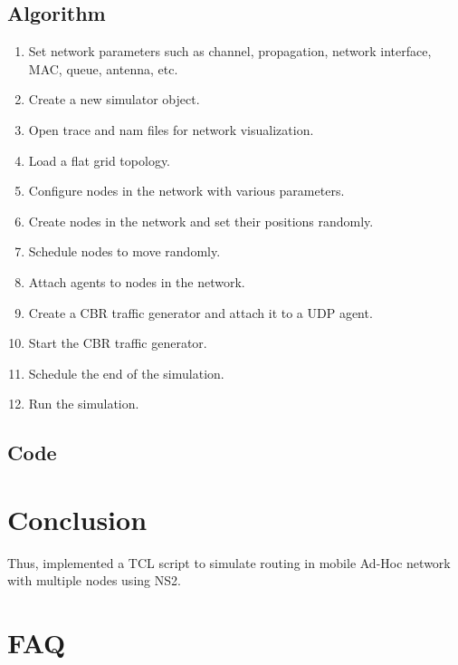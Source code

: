 \documentclass[11pt]{article}
\begin{document}
\subsection{Algorithm}
\begin{enumerate}
    \item Set network parameters such as channel, propagation, network interface, MAC, queue, antenna, etc.
    \item Create a new simulator object.
    \item Open trace and nam files for network visualization.
    \item Load a flat grid topology.
    \item Configure nodes in the network with various parameters.
    \item Create nodes in the network and set their positions randomly.
    \item Schedule nodes to move randomly.
    \item Attach agents to nodes in the network.
    \item Create a CBR traffic generator and attach it to a UDP agent.
    \item Start the CBR traffic generator.
    \item Schedule the end of the simulation.
    \item Run the simulation.
\end{enumerate}

\subsection{Code}



\section{Conclusion}
Thus, implemented a TCL script to simulate routing in mobile Ad-Hoc network with
multiple nodes using NS2.
\clearpage

\section{FAQ}
\end{document}
